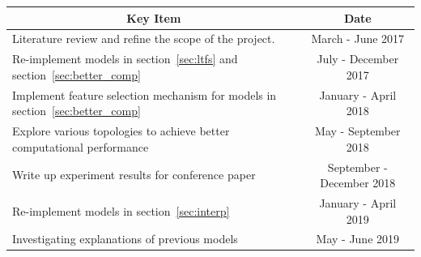 \message{ !name(usyd_phd_proposal.tex)}\documentclass{article} \usepackage{tabularx}
\begin{document}
	\begin{table}[H]
		\centering
		\label{tab:work_plan}
		\def\arraystretch{1.5}%
		\begin{tabularx}{\textwidth}{|X|l|}
			\hline
			\multicolumn{1}{|c|}{\textbf{Key Item}}                                                        & \multicolumn{1}{c|}{\textbf{Date}} \\ \hline
			Literature review and refine the scope of the project.
                                                                                                     &
                                                                                                       \multicolumn{1}{c|}{March
                                                                                                       -
                                                                                                       June
                                                                                                       2017}
      \\ \hline
			Re-implement models in section~\ref{sec:ltfs} and section~\ref{sec:better_comp} &
                                                                                        \multicolumn{1}{c|}{July
                                                                                        -
                                                                                        December
                                                                                        2017}            \\ \hline
			Implement feature selection mechanism for models in
      section~\ref{sec:better_comp} & \multicolumn{1}{c|}{January
                                      - April 2018}          \\ \hline
			Explore various topologies to achieve better computational
      performance & \multicolumn{1}{c|}{May - September 2018}             \\ \hline
			Write up experiment results for conference paper & \multicolumn{1}{c|}{September - December 2018}       \\ \hline
			Re-implement models in section~\ref{sec:interp} &
                                                        \multicolumn{1}{c|}{January
                                                        - April 2019}            \\ \hline
      Investigating explanations of previous models &
                                                      \multicolumn{1}{c|}{May - June 2019}                \\ \hline

\end{tabularx}
\end{table}
\end{document}
